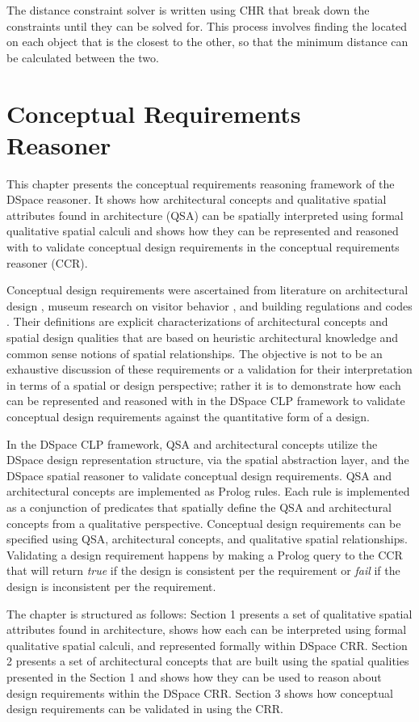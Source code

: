 \documentclass[12pt]{ucthesis}
\begin{document}
The distance constraint solver is written using CHR that break down the constraints until they can be solved for. This process involves finding the located on each object that is the closest to the other, so that the minimum distance can be calculated between the two. 


\chapter{Conceptual Requirements Reasoner}
This chapter presents the conceptual requirements reasoning framework of the DSpace reasoner. It shows how architectural concepts and qualitative spatial attributes found in architecture (QSA) can be spatially interpreted using formal qualitative spatial calculi and shows how they can be represented and reasoned with to validate conceptual design requirements in the conceptual requirements reasoner (CCR). 

Conceptual design requirements were ascertained from literature on architectural design \cite{tbd}, museum research on visitor behavior \cite{tbd}, and building regulations and codes \cite{tbd}. Their definitions are explicit characterizations of architectural concepts and spatial design qualities that are based on heuristic architectural knowledge and common sense notions of spatial relationships. The objective is not to be an exhaustive discussion of these requirements or a validation for their interpretation in terms of a spatial or design perspective; rather it is to demonstrate how each can be represented and reasoned with in the DSpace CLP framework to validate conceptual design requirements against the quantitative form of a design. 

In the DSpace CLP framework, QSA and architectural concepts utilize the DSpace design representation structure, via the spatial abstraction layer, and the DSpace spatial reasoner to validate conceptual design requirements. QSA and architectural concepts are implemented as Prolog rules. Each rule is implemented as a conjunction of predicates that spatially define the QSA and architectural concepts from a qualitative perspective. Conceptual design requirements can be specified using QSA, architectural concepts, and qualitative spatial relationships. Validating a design requirement happens by making a Prolog query to the CCR that will return \emph{true} if the design is consistent per the requirement or \emph{fail} if the design is inconsistent per the requirement. 

The chapter is structured as follows: Section 1 presents a set of qualitative spatial attributes found in architecture, shows how each can be interpreted using formal qualitative spatial calculi, and represented formally within DSpace CRR. Section 2 presents a set of architectural concepts that are built using the spatial qualities presented in the Section 1 and shows how they can be used to reason about design requirements within the DSpace CRR. Section 3 shows how conceptual design requirements can be validated in using the CRR.
\end{document}
